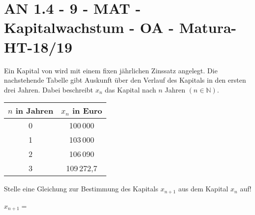 \section{AN 1.4 - 9 - MAT - Kapitalwachstum - OA - Matura-HT-18/19}

\begin{beispiel}[AN 1.4]{1}
Ein Kapital von  wird mit einem fixen jährlichen Zinssatz angelegt. Die nachstehende Tabelle gibt Auskunft über den Verlauf des Kapitals in den ersten drei Jahren. Dabei beschreibt $x_n$ das Kapital nach $n$ Jahren $(n\in\mathbb{N})$.
\begin{center}
\begin{tabular}{|c|c|}\hline
\cellcolor[gray]{0.9}$n$ in Jahren&\cellcolor[gray]{0.9}$x_n$ in Euro\\ \hline
0&100\,000\\ \hline
1&103\,000\\ \hline
2&106\,090\\ \hline
3&109\,272,7\\ \hline
\end{tabular}
\end{center}

Stelle eine Gleichung zur Bestimmung des Kapitals $x_{n+1}$ aus dem Kapital $x_n$ auf!\leer

$x_{n+1}=$\,
\end{beispiel}